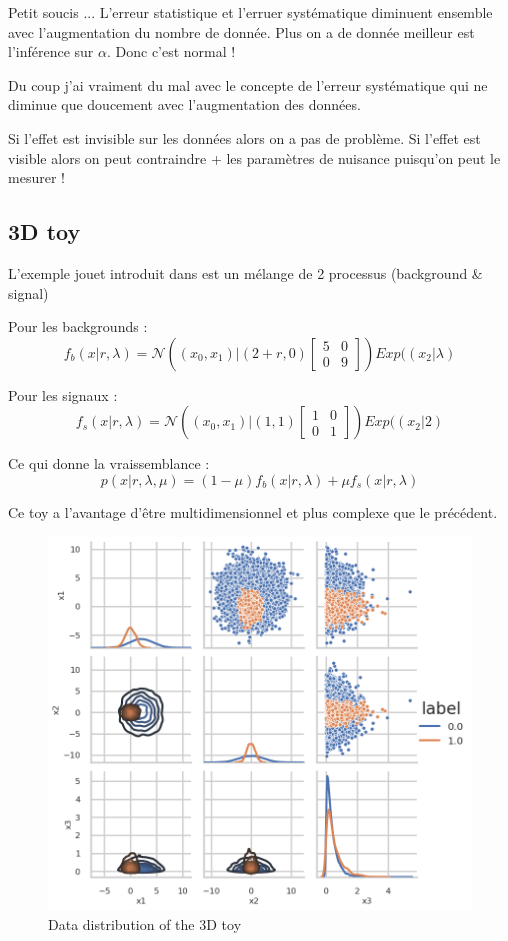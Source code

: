Petit soucis ... L'erreur statistique et l'erruer systématique diminuent ensemble avec l'augmentation du nombre de donnée.
Plus on a de donnée meilleur est l'inférence sur $\alpha$.
Donc c'est normal !

Du coup j'ai vraiment du mal avec le concepte de l'erreur systématique qui ne diminue que doucement avec l'augmentation des données.

Si l'effet est invisible sur les données alors on a pas de problème.
Si l'effet est visible alors on peut contraindre + les paramètres de nuisance puisqu'on peut le mesurer !


\subsection{3D toy} %
\label{sub:3d_toy}

L'exemple jouet introduit dans \cite{DECASTRO2019170inferno} est un mélange de 2 processus (background \& signal)


Pour les backgrounds :
$$
f_b (x|r, \lambda) = \mathcal N \left ( (x_0, x_1) | (2+r, 0) 
\begin{bmatrix} 5 & 0 \\ 0 & 9 \end{bmatrix} \right ) Exp((x_2| \lambda)
$$


Pour les signaux :
$$
f_s (x|r, \lambda) = \mathcal N \left ( (x_0, x_1) | (1, 1) 
\begin{bmatrix} 1 & 0 \\ 0 & 1 \end{bmatrix} \right ) Exp((x_2| 2)
$$

Ce qui donne la vraissemblance :
$$
p(x | r, \lambda, \mu ) = (1-\mu) f_b(x|r, \lambda) + \mu f_s(x|r, \lambda)
$$

Ce toy a l'avantage d'être multidimensionnel et plus complexe que le précédent.


\begin{figure}[htb]
    \includegraphics[width=\linewidth]{s3d2/pairgrid}
    \caption{Data distribution of the 3D toy}
    \label{fig:s3d2_pairgrid}
\end{figure}


